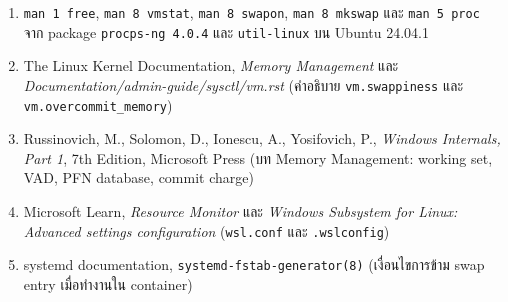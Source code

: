 \documentclass[a4paper,11pt]{article}
\newcommand{\code}[1]{\texttt{#1}}
\begin{document}
\begin{enumerate}[leftmargin=*]
  \item \code{man 1 free}, \code{man 8 vmstat}, \code{man 8 swapon}, \code{man 8 mkswap} และ \code{man 5 proc} จาก package \code{procps-ng 4.0.4} และ \code{util-linux} บน Ubuntu 24.04.1
  \item The Linux Kernel Documentation, \textit{Memory Management} และ \textit{Documentation/admin-guide/sysctl/vm.rst} (คำอธิบาย \code{vm.swappiness} และ \code{vm.overcommit\_memory})
  \item Russinovich, M., Solomon, D., Ionescu, A., Yosifovich, P., \textit{Windows Internals, Part 1}, 7th Edition, Microsoft Press (บท Memory Management: working set, VAD, PFN database, commit charge)
  \item Microsoft Learn, \textit{Resource Monitor} และ \textit{Windows Subsystem for Linux: Advanced settings configuration} (\code{wsl.conf} และ \code{.wslconfig})
  \item systemd documentation, \code{systemd-fstab-generator(8)} (เงื่อนไขการข้าม swap entry เมื่อทำงานใน container)
\end{enumerate}
\end{document}
